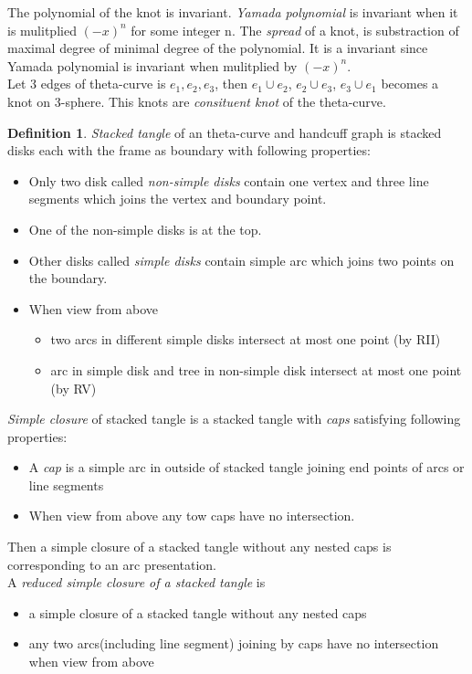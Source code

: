 \documentclass{article}
\theoremstyle{definition}
\newtheorem{defn}[thm]{Definition}
\theoremstyle{theorem}
\theoremstyle{proposition}
\theoremstyle{corollary}
\begin{document}
The polynomial of the knot is invariant. \textit{Yamada polynomial} is invariant when it is mulitplied $(-x)^n$ for some integer n. The \textit{spread} of a knot, is substraction of maximal degree of minimal degree of the polynomial. It is a invariant since Yamada polynomial is invariant when mulitplied by $(-x)^n$.\\

Let 3 edges of theta-curve is $e_1, e_2, e_3$, then $e_1 \cup e_2$, $e_2 \cup e_3$, $e_3 \cup e_1$ becomes a knot on 3-sphere. This knots are \textit{consituent knot} of the theta-curve.

\begin{defn}
    \textit{Stacked tangle} of an theta-curve and handcuff graph is stacked disks each with the frame as boundary with following properties:
\end{defn}
\begin{itemize}
\item Only two disk called \textit{non-simple disks} contain one vertex and three line
segments which joins the vertex and boundary point.
\item One of the non-simple disks is at the top.
\item Other disks called \textit{simple disks} contain simple arc which joins two
points on the boundary.
\item When view from above
\begin{itemize}
    \item two arcs in different simple disks intersect at most one point (by RII)
    \item arc in simple disk and tree in non-simple disk intersect at most one
point (by RV)
\end{itemize}
\end{itemize}

\textit{Simple closure} of stacked tangle is a stacked tangle with \textit{caps} satisfying following properties:
\begin{itemize}
    \item A \textit{cap} is a simple arc in outside of stacked tangle joining end points of arcs or line segments
    \item When view from above any tow caps have no intersection.
\end{itemize}
Then a simple closure of a stacked tangle without any nested caps is
corresponding to an arc presentation.\\

A \textit{reduced simple closure of a stacked tangle} is
\begin{itemize}
    \item a simple closure of a stacked tangle without any nested caps
    \item any two arcs(including line segment) joining by caps have no intersection when view from above
\end{itemize}
\end{document}
